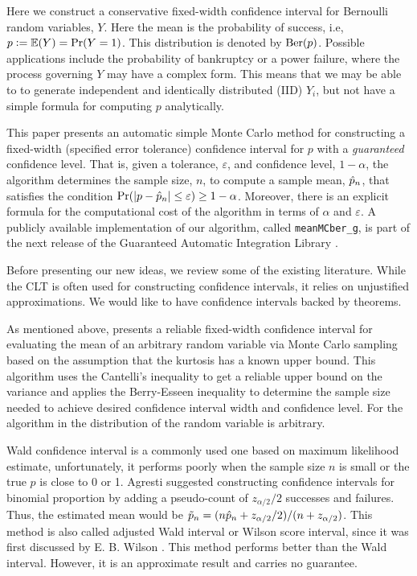 \documentclass{iitthesis}
\begin{document}
Here we construct a conservative fixed-width confidence interval for Bernoulli random variables, $Y$. Here the mean is the probability of success, i.e,  $p:= \mathbb{E}(Y)=\Pr(Y=1)$.  This distribution is denoted by $\operatorname{Ber}(p)$.  Possible applications include the probability of bankruptcy or a power failure, where the process governing $Y$ may have a complex form.  This means that we may be able to to generate independent and identically distributed (IID) $Y_i$, but not have a simple formula for computing $p$ analytically. 

This paper presents an automatic simple Monte Carlo method for constructing a fixed-width (specified error tolerance) confidence interval for $p$ with a \textit{guaranteed} confidence level.  That is, given a tolerance, $\varepsilon$, and confidence level, $1-\alpha$, the algorithm determines the sample size, $n$, to compute a sample mean, $\hat{p}_n$, that satisfies the condition $\Pr(\left \lvert p-\hat{p}_n \right \rvert\leq \varepsilon) \geq 1-\alpha$.  Moreover, there is an explicit formula for the computational cost of the algorithm in terms of $\alpha$ and $\varepsilon$. A publicly available implementation of our algorithm, called {\tt meanMCber\_g}, is part of the next release of the Guaranteed Automatic Integration Library \cite{GAIL_1_3}.

Before presenting our new ideas, we review some of the existing literature.  While the CLT is often used for constructing confidence intervals, it relies on unjustified approximations.  We would like to have confidence intervals backed by theorems.

As mentioned above, \cite{HJLO12} presents a  reliable fixed-width confidence interval for evaluating the mean of an arbitrary random variable via Monte Carlo sampling based on the assumption that the kurtosis has a known upper bound. This algorithm uses the Cantelli's inequality to get a reliable upper bound on the variance and applies the Berry-Esseen inequality to determine the sample size needed to achieve desired confidence interval width and confidence level. For the algorithm in \cite{HJLO12} the distribution of the random variable is arbitrary. 

Wald confidence interval \cite[Section 1.3.3]{Agresti02} is a commonly used one based on maximum likelihood estimate, unfortunately, it performs poorly when the sample size $n$ is small or the true $p$ is close to 0 or 1. Agresti \cite[Section 1.4.2]{Agresti02} suggested constructing confidence intervals for binomial proportion by adding a pseudo-count of $z_{\alpha/2}/2$ successes and failures.  Thus, the estimated mean would be $\tilde{p}_n =(n\hat{p}_n+z_{\alpha/2}/2) / (n+z_{\alpha/2})$. This method is also called adjusted Wald interval or Wilson score interval, since it was first discussed by E. B. Wilson \cite{wilson27}. This method performs better than the Wald interval.  However, it is an approximate result and carries no guarantee.
\end{document}
